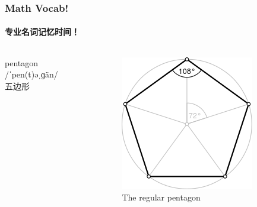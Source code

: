 \documentclass[
	11pt, %
]{beamer}
\begin{document}
\begin{frame}
	\frametitle{Math Vocab!} %
	\framesubtitle{专业名词记忆时间！}
	

	\begin{columns}[t] 
	\begin{column}{0.4\textwidth} %
		{\Huge pentagon}\\
		{\LARGE /ˈpen(t)əˌɡän/\\
			\bigskip\bigskip
		五边形}
	\end{column}
	\begin{column}{0.6\textwidth} %
		\begin{figure}
			\includegraphics[width=0.8\linewidth]{220px-Regular_polygon_5_annotated.svg.png}
			\caption{The regular pentagon}
		\end{figure}	
	\end{column}
\end{columns}

\end{frame}

\end{document}
